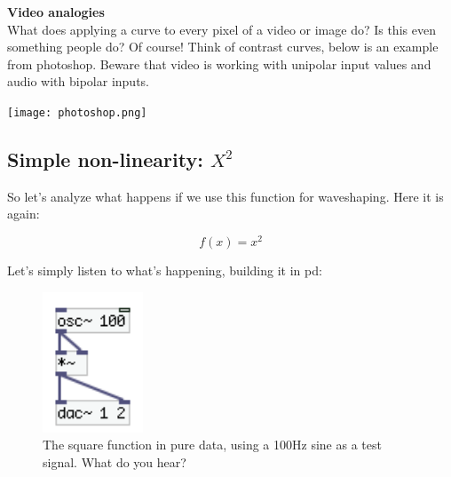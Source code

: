 
\begin{framed}
\textbf{Video analogies}\\
What does applying a curve to every pixel of a video or image do? Is this even something people do? Of course! Think of contrast curves, below is an example from photoshop. Beware that video is working with unipolar input values and audio with bipolar inputs.
\begin{center}
  \texttt{[image: photoshop.png]}
  \label{fig:photoshop}
\end{center}
\end{framed}




\subsection{Simple non-linearity: \(X ^2\)} %
\label{sub:nonLinearTrans}

So let's analyze what happens if we use this function for waveshaping. Here it is again:

\begin{equation}
f(x) = x ^ 2
\end{equation}



Let's simply listen to what's happening, building it in pd:

\begin{figure}[H]
	\begin{center}
		\includegraphics[width = 3cm]{img/pd_square.png}
		\caption{The square function in pure data, using a 100Hz sine as a test signal. What do you hear?}
		\label{fig:squarePd}
	\end{center}
\end{figure}



